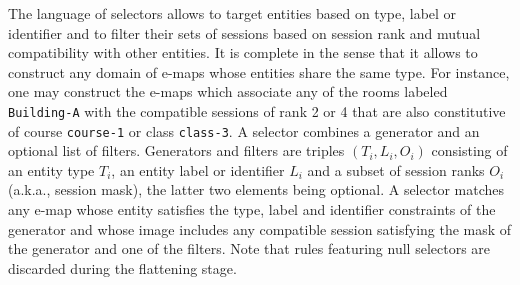 The language of selectors allows 
to target entities based on type, label or identifier
and
to filter their sets of sessions
based on session rank and mutual compatibility with other entities.
It is complete in the sense 
that it allows to construct any domain of e-maps whose entities share the same type.
For instance, one may construct the e-maps which
associate any of the rooms labeled \texttt{Building-A}
with the compatible sessions of rank 2 or 4 
that are also constitutive of course \texttt{course-1} or class \texttt{class-3}.
A selector
combines a generator and an optional list of filters.
Generators and filters are triples 
$
(T_i,L_i,O_i)
$
consisting of
an entity type
$
T_i%
$,
an entity label or identifier
$
L_i%
$
and
a subset of session ranks
$
O_i%
$ (a.k.a., session mask),
the latter two elements being optional.
A selector 
matches any e-map
whose entity satisfies the type, label and identifier constraints of the generator
and whose %
image includes any compatible session
satisfying the mask of the generator
and one of the filters.
Note that rules featuring null selectors are discarded during the flattening stage. 

